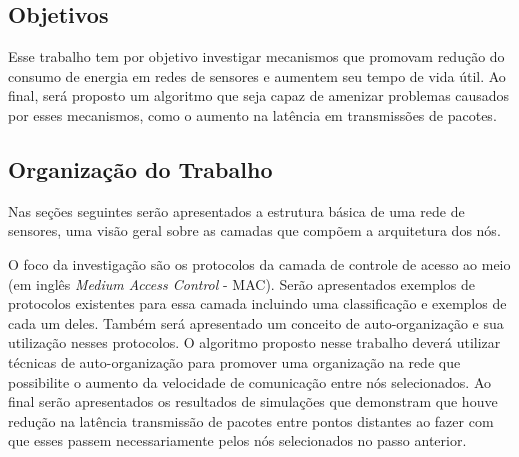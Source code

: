 \subsection{Objetivos}

Esse trabalho tem por objetivo investigar mecanismos que promovam redução do consumo de energia em redes de sensores e aumentem seu tempo de vida útil. Ao final, será proposto um algoritmo que seja capaz de amenizar problemas causados por esses mecanismos, como o aumento na latência em transmissões de pacotes. 

\subsection{Organização do Trabalho}

Nas seções seguintes serão apresentados a estrutura básica de uma rede de sensores, uma visão geral sobre as camadas que compõem a arquitetura dos nós. 

O foco da investigação são os protocolos da camada de controle de acesso ao meio (em inglês \emph{Medium Access Control} - MAC). Serão apresentados exemplos de protocolos existentes para essa camada incluindo uma classificação e exemplos de cada um deles. Também será apresentado um conceito de auto-organização e sua utilização nesses protocolos. O algoritmo proposto nesse trabalho deverá utilizar técnicas de auto-organização para promover uma organização na rede que possibilite o aumento da velocidade de comunicação entre nós selecionados. Ao final serão apresentados os resultados de simulações que demonstram que houve redução na latência transmissão de pacotes entre pontos distantes ao fazer com que esses passem necessariamente pelos nós selecionados no passo anterior. 